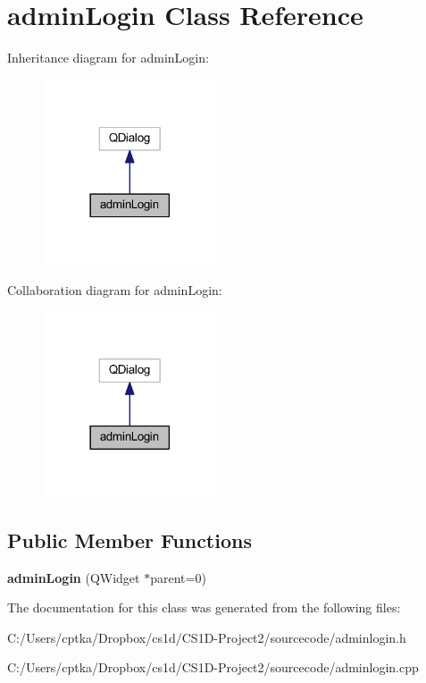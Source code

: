 \hypertarget{classadmin_login}{}\section{admin\+Login Class Reference}
\label{classadmin_login}


Inheritance diagram for admin\+Login\+:
\nopagebreak
\begin{figure}[H]
\begin{center}
\leavevmode
\includegraphics[width=146pt]{classadmin_login__inherit__graph}
\end{center}
\end{figure}


Collaboration diagram for admin\+Login\+:
\nopagebreak
\begin{figure}[H]
\begin{center}
\leavevmode
\includegraphics[width=146pt]{classadmin_login__coll__graph}
\end{center}
\end{figure}
\subsection*{Public Member Functions}
\begin{DoxyCompactItemize}
\item 
\mbox{\label{classadmin_login_af54a37e045217bf6017dbe8874e1a534}} 
{\bfseries admin\+Login} (Q\+Widget $\ast$parent=0)
\end{DoxyCompactItemize}


The documentation for this class was generated from the following files\+:\begin{DoxyCompactItemize}
\item 
C\+:/\+Users/cptka/\+Dropbox/cs1d/\+C\+S1\+D-\/\+Project2/sourcecode/adminlogin.\+h\item 
C\+:/\+Users/cptka/\+Dropbox/cs1d/\+C\+S1\+D-\/\+Project2/sourcecode/adminlogin.\+cpp\end{DoxyCompactItemize}
